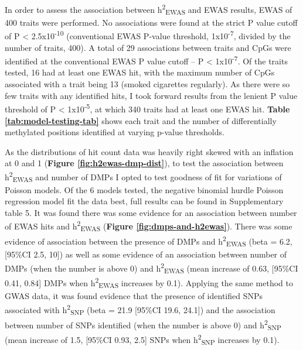 \documentclass[11pt,oneside]{bristolthesis}
\begin{document}
In order to assess the association between h\textsuperscript{2}\textsubscript{EWAS} and EWAS results, EWAS of 400 traits were performed. No associations were found at the strict P value cutoff of P \textless{} 2.5x10\textsuperscript{-10} (conventional EWAS P-value threshold, 1x10\textsuperscript{-7}, divided by the number of traits, 400). A total of 29 associations between traits and CpGs were identified at the conventional EWAS P value cutoff -- P \textless{} 1x10\textsuperscript{-7}. Of the traits tested, 16 had at least one EWAS hit, with the maximum number of CpGs associated with a trait being 13 (smoked cigarettes regularly). As there were so few traits with any identified hits, I took forward results from the lenient P value threshold of P \textless{} 1x10\textsuperscript{-5}, at which 340 traits had at least one EWAS hit. \textbf{Table \ref{tab:model-testing-tab}} shows each trait and the number of differentially methylated positions identified at varying p-value thresholds.

As the distributions of hit count data was heavily right skewed with an inflation at 0 and 1 (\textbf{Figure \ref{fig:h2ewas-dmp-dist}}), to test the association between h\textsuperscript{2}\textsubscript{EWAS} and number of DMPs I opted to test goodness of fit for variations of Poisson models. Of the 6 models tested, the negative binomial hurdle Poisson regression model fit the data best, full results can be found in Supplementary table 5. It was found there was some evidence for an association between number of EWAS hits and h\textsuperscript{2}\textsubscript{EWAS} (\textbf{Figure \ref{fig:dmps-and-h2ewas}}). There was some evidence of association between the presence of DMPs and h\textsuperscript{2}\textsubscript{EWAS} (beta = 6.2, {[}95\%CI 2.5, 10{]}) as well as some evidence of an association between number of DMPs (when the number is above 0) and h\textsuperscript{2}\textsubscript{EWAS} (mean increase of 0.63, {[}95\%CI 0.41, 0.84{]} DMPs when h\textsuperscript{2}\textsubscript{EWAS} increases by 0.1). Applying the same method to GWAS data, it was found evidence that the presence of identified SNPs associated with h\textsuperscript{2}\textsubscript{SNP} (beta = 21.9 {[}95\%CI 19.6, 24.1{]}) and the association between number of SNPs identified (when the number is above 0) and h\textsuperscript{2}\textsubscript{SNP} (mean increase of 1.5, {[}95\%CI 0.93, 2.5{]} SNPs when h\textsuperscript{2}\textsubscript{SNP} increases by 0.1).
\end{document}
